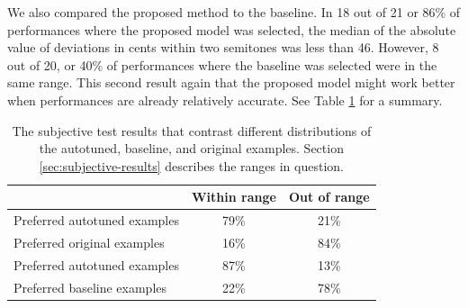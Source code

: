 We also compared the proposed method to the baseline. In 18 out of 21 or 86\% of performances where the proposed model was selected, the median of the absolute value of deviations in cents within two semitones was less than 46. However, 8 out of 20, or 40\% of performances where the baseline was selected were in the same range. This second result again that the proposed model might work better when performances are already relatively accurate. See Table \ref{tab:result-autotune} for a summary. 

\begin{table}[t]
  \begin{center}
  \vspace{-0.05in}
    \caption{The subjective test results that contrast different distributions of the autotuned, baseline, and original examples. Section \ref{sec:subjective-results} describes the ranges in question.}
    \begin{tabular}{|l||c|c|}
    \hline
      & Within range & Out of range \\
      \hline
      Preferred autotuned examples & 79\% & 21\% \\
      Preferred original examples & 16\% & 84\% \\
      \hline
      Preferred autotuned examples & 87\% & 13\% \\
      Preferred baseline examples & 22\% & 78\% \\
      \hline
    \end{tabular}
    \vspace{-0.2in}
    \label{tab:result-autotune}
  \end{center}
\end{table}

